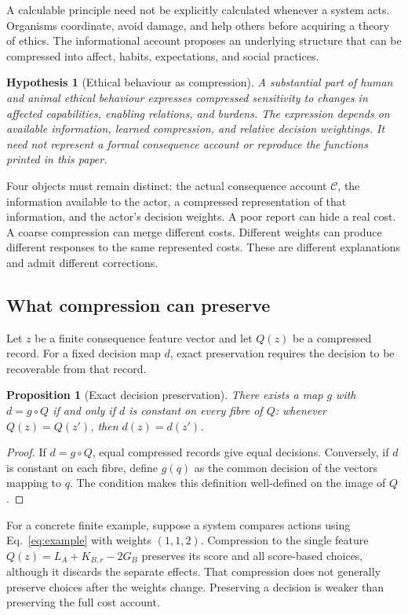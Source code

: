 \documentclass[11pt,a4paper]{article}
\newtheorem{proposition}[definition]{Proposition}
\newtheorem{hypothesis}[definition]{Hypothesis}
\theoremstyle{remark}
\newcommand{\C}{\mathcal C}
\begin{document}
A calculable principle need not be explicitly calculated whenever a system acts.
Organisms coordinate, avoid damage, and help others before acquiring a theory of
ethics. The informational account proposes an underlying structure that can be
compressed into affect, habits, expectations, and social practices.

\begin{hypothesis}[Ethical behaviour as compression]\label{hyp:compression}
A substantial part of human and animal ethical behaviour expresses compressed
sensitivity to changes in affected capabilities, enabling relations, and burdens.
The expression depends on available information, learned compression, and
relative decision weightings. It need not represent a formal consequence account
or reproduce the functions printed in this paper.
\end{hypothesis}

Four objects must remain distinct: the actual consequence account $\C$, the
information available to the actor, a compressed representation of that
information, and the actor's decision weights. A poor report can hide a real
cost. A coarse compression can merge different costs. Different weights can
produce different responses to the same represented costs. These are different
explanations and admit different corrections.

\subsection{What compression can preserve}

Let $z$ be a finite consequence feature vector and let $Q(z)$ be a compressed
record. For a fixed decision map $d$, exact preservation requires the decision
to be recoverable from that record.

\begin{proposition}[Exact decision preservation]\label{prop:compression}
There exists a map $g$ with $d=g\circ Q$ if and only if $d$ is constant on every
fibre of $Q$: whenever $Q(z)=Q(z')$, then $d(z)=d(z')$.
\end{proposition}
\begin{proof}
If $d=g\circ Q$, equal compressed records give equal decisions. Conversely,
if $d$ is constant on each fibre, define $g(q)$ as the common decision of the
vectors mapping to $q$. The condition makes this definition well-defined on
the image of $Q$.
\end{proof}

For a concrete finite example, suppose a system compares actions using
Eq.~\eqref{eq:example} with weights $(1,1,2)$. Compression to the single feature
$Q(z)=L_A+K_{B,r}-2G_B$ preserves its score and all score-based choices, although
it discards the separate effects. That compression does not generally preserve
choices after the weights change. Preserving a decision is weaker than preserving
the full cost account.
\end{document}
